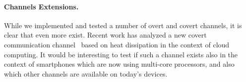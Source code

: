 \paragraph{Channels Extensions.} While we implemented and tested a number of overt and covert channels, it is clear that even more exist. Recent work has analyzed a new covert communication channel~\cite{ramyaheat} based on heat dissipation in the context of cloud computing. It would be interesting to test if such a channel exists also in the context of smartphones which are now using multi-core processors, and also which other channels are available on today's devices.
